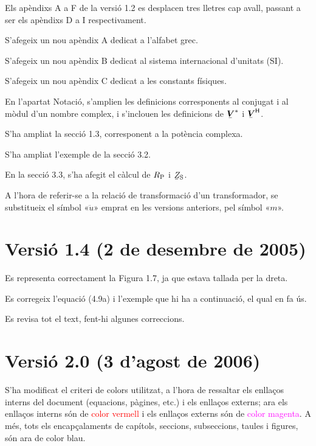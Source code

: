 Els apèndixs A a F de la versió 1.2 es desplacen tres lletres cap
avall, passant a ser els apèndixs D a I respectivament.

S'afegeix un nou apèndix A dedicat a l'alfabet grec.

S'afegeix un nou apèndix B dedicat al sistema internacional
d'unitats (SI).

S'afegeix un nou apèndix C dedicat a les constants físiques.

En l'apartat Notació, s'amplien les definicions corresponents al
conjugat i al mòdul d'un nombre complex, i s'inclouen les
definicions de $\mcmplx{V}^*$ i $\hermit{V}$.

S'ha ampliat la secció 1.3, corresponent a la
potència complexa.

 S'ha ampliat l'exemple de la secció 3.2.

En la secció 3.3, s'ha afegit el càlcul de $R_\mathrm{P}$ i
$\cmplx{Z}\ped{S}$.

 A l'hora de referir-se a la
relació de transformació d'un transformador, se substitueix el
símbol «$\ddot{u}$» emprat en les versions anteriors, pel símbol
«$m$».

\section*{Versió 1.4 (2 de desembre de 2005)}

Es representa correctament la Figura 1.7, ja que estava
tallada per la dreta.

Es corregeix l'equació (4.9a) i l'exemple que hi
ha a continuació, el qual en fa ús.

Es revisa tot el text, fent-hi algunes correccions.

\section*{Versió 2.0 (3 d'agost de 2006)}

S'ha modificat el criteri de colors utilitzat, a l'hora de ressaltar
els enllaços interns del document (equacions, pàgines, etc.) i els
enllaços externs; ara els enllaços interns són de
\textcolor{red}{color vermell} i els enllaços externs són de
\textcolor{magenta}{color magenta}. A més, tots els encapçalaments
de capítols, seccions,
 subseccions, taules  i figures, són ara de
 \textcolor{NavyBlue}{color blau}.

